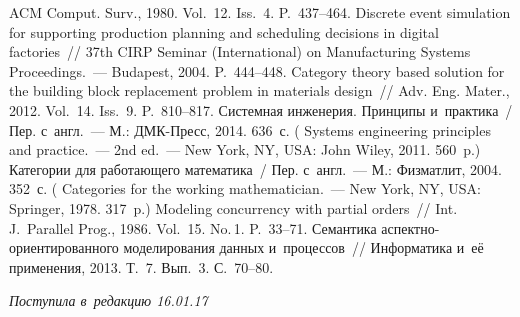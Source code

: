 \begin{multicols}{2}
{{\begin{thebibliography}{99}
ACM  Comput. Surv., 1980. Vol.~12. Iss.~4. P.~437--464.
 Discrete event 
simulation for supporting production planning and scheduling decisions in digital
 factories~//  37th 
CIRP Seminar (International) on Manufacturing Systems Proceedings.~--- Budapest, 2004.  
P.~444--448.
 Category theory based solution for the building block 
replacement problem in materials design~// Adv. Eng. Mater., 2012. Vol.~14. 
Iss.~9. P.~810--817.
 Системная инженерия. Принципы 
и~практика~/ Пер. с~англ.~--- М.: ДМК-Пресс, 2014. 636~с. ( Systems engineering principles and practice.~--- 2nd ed.~--- New 
York, NY, USA: John Wiley, 2011. 560~p.)
 Категории для работающего математика~/ Пер. с~англ.~--- М.: Физматлит, 
2004. 352~с. ( Categories for the working mathematician.~--- New York, NY, 
USA: Springer, 1978. 317~p.)
 Modeling concurrency with partial orders~// Int. J.~Parallel 
Prog., 1986. Vol.~15. No.\,1. P.~33--71.
 Семантика ас\-пект\-но-ори\-ен\-ти\-ро\-ван\-но\-го моделирования 
данных и~процессов~// Информатика и~её применения, 2013. Т.~7. Вып.~3. С.~70--80.
 \end{thebibliography}

 }
 }

\end{multicols}

\vspace*{-3pt}

\hfill{\small\textit{Поступила в~редакцию 16.01.17}}


\newpage

\vspace*{-30pt}






\def\tit{METHODS OF CATEGORY THEORY IN~MODEL-BASED SYSTEMS ENGINEERING\\[-7pt]}

\def\titkol{Methods of category theory in~model-based systems engineering}

